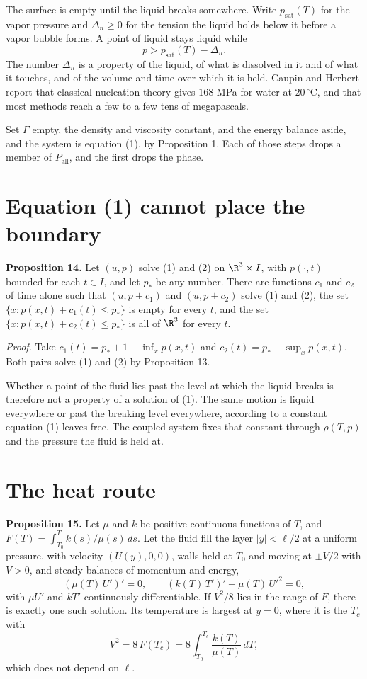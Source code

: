 The surface is empty until the liquid breaks somewhere. Write $p_{\mathrm{sat}}(T)$ for the vapor
pressure and $\Delta_n \ge 0$ for the tension the liquid holds below it before a vapor bubble
forms. A point of liquid stays liquid while
\[
p > p_{\mathrm{sat}}(T) - \Delta_n .
\]
The number $\Delta_n$ is a property of the liquid, of what is dissolved in it and of what it
touches, and of the volume and time over which it is held. Caupin and Herbert report that
classical nucleation theory gives $168$ MPa for water at $20\,^\circ$C, and that most methods
reach a few to a few tens of megapascals.

Set $\Gamma$ empty, the density and viscosity constant, and the energy balance aside, and the
system is equation (1), by Proposition 1. Each of those steps drops a member of
$P_{\mathrm{all}}$, and the first drops the phase.

\section{Equation (1) cannot place the boundary}

\textbf{Proposition 14.} Let $(u,p)$ solve (1) and (2) on $\R^3\times I$, with $p(\cdot,t)$
bounded for each $t\in I$, and let $p_*$ be any number. There are functions $c_1$ and $c_2$ of time
alone such that $(u,p+c_1)$ and $(u,p+c_2)$ solve (1) and (2), the set
$\{x : p(x,t) + c_1(t) \le p_*\}$ is empty for every $t$, and the set
$\{x : p(x,t) + c_2(t) \le p_*\}$ is all of $\R^3$ for every $t$.

\emph{Proof.} Take $c_1(t) = p_* + 1 - \inf_x p(x,t)$ and $c_2(t) = p_* - \sup_x p(x,t)$. Both
pairs solve (1) and (2) by Proposition 13. \hfill\qedsymbol

Whether a point of the fluid lies past the level at which the liquid breaks is therefore not a
property of a solution of (1). The same motion is liquid everywhere or past the breaking level
everywhere, according to a constant equation (1) leaves free. The coupled system fixes that
constant through $\rho(T,p)$ and the pressure the fluid is held at.

\section{The heat route}

\textbf{Proposition 15.} Let $\mu$ and $k$ be positive continuous functions of $T$, and
$F(T) = \int_{T_0}^{T} k(s)/\mu(s)\,ds$. Let the fluid fill the layer $|y| < \ell/2$ at a uniform
pressure, with velocity $(U(y),0,0)$, walls held at $T_0$ and moving at $\pm V/2$ with $V > 0$,
and steady balances of momentum and energy,
\[
(\mu(T)\,U')' = 0, \qquad (k(T)\,T')' + \mu(T)\,U'^2 = 0,
\]
with $\mu U'$ and $kT'$ continuously differentiable. If $V^2/8$ lies in the range of $F$, there
is exactly one such solution. Its temperature is largest at $y = 0$, where it is the $T_c$ with
\[
V^2 = 8\,F(T_c) = 8\int_{T_0}^{T_c}\frac{k(T)}{\mu(T)}\,dT ,
\]
which does not depend on $\ell$.

